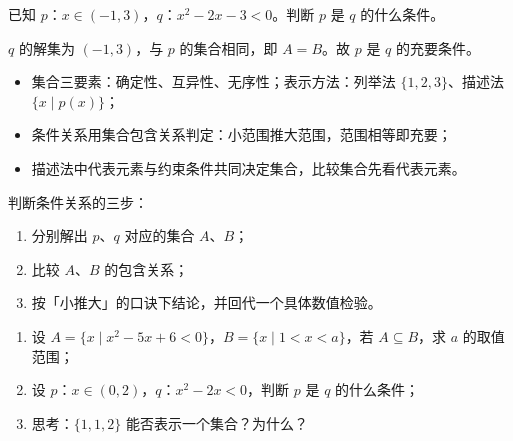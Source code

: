 \begin{example}
已知 $p$：$x\in(-1,3)$，$q$：$x^2-2x-3<0$。判断 $p$ 是 $q$ 的什么条件。
\end{example}
\begin{solution}
$q$ 的解集为 $(-1,3)$，与 $p$ 的集合相同，即 $A=B$。故 $p$ 是 $q$ 的充要条件。
\end{solution}

\begin{summary}
\begin{itemize}
  \item 集合三要素：确定性、互异性、无序性；表示方法：列举法 $\{1,2,3\}$、描述法 $\{x\mid p(x)\}$；
  \item 条件关系用集合包含关系判定：小范围推大范围，范围相等即充要；
  \item 描述法中代表元素与约束条件共同决定集合，比较集合先看代表元素。
\end{itemize}
\end{summary}

\begin{method}
判断条件关系的三步：
\begin{enumerate}
  \item 分别解出 $p$、$q$ 对应的集合 $A$、$B$；
  \item 比较 $A$、$B$ 的包含关系；
  \item 按「小推大」的口诀下结论，并回代一个具体数值检验。
\end{enumerate}
\end{method}

\begin{exercise}
\begin{enumerate}
  \item 设 $A=\{x\mid x^2-5x+6<0\}$，$B=\{x\mid 1<x<a\}$，若 $A\subseteq B$，求 $a$ 的取值范围；
  \item 设 $p$：$x\in(0,2)$，$q$：$x^2-2x<0$，判断 $p$ 是 $q$ 的什么条件；
  \item 思考：$\{1,1,2\}$ 能否表示一个集合？为什么？
\end{enumerate}
\end{exercise}

